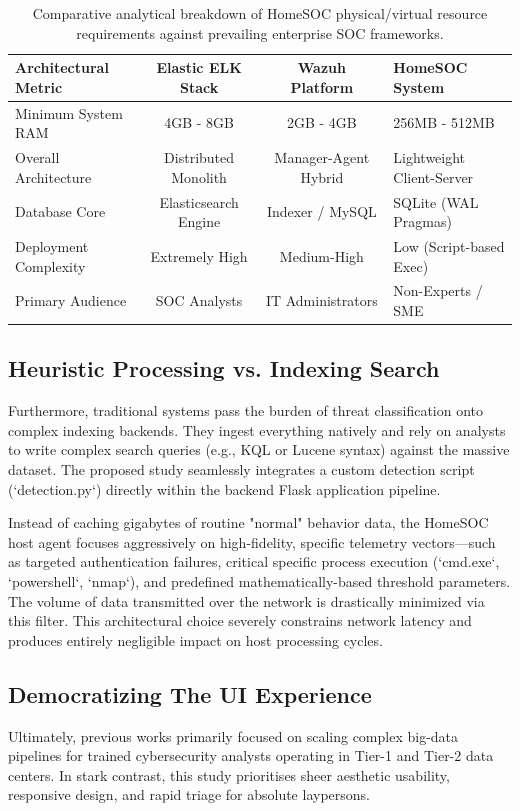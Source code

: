 \begin{table}[h]
\centering
\small
\begin{tabularx}{\textwidth}{|X|c|c|X|}
\hline
\textbf{Architectural Metric} & \textbf{Elastic ELK Stack} & \textbf{Wazuh Platform} & \textbf{HomeSOC System} \\ \hline
Minimum System RAM & 4GB - 8GB & 2GB - 4GB & 256MB - 512MB \\ \hline
Overall Architecture & Distributed Monolith & Manager-Agent Hybrid & Lightweight Client-Server \\ \hline
Database Core & Elasticsearch Engine & Indexer / MySQL & SQLite (WAL Pragmas) \\ \hline
Deployment Complexity & Extremely High & Medium-High & Low (Script-based Exec) \\ \hline
Primary Audience & SOC Analysts & IT Administrators & Non-Experts / SME \\ \hline
\end{tabularx}
\caption{Comparative analytical breakdown of HomeSOC physical/virtual resource requirements against prevailing enterprise SOC frameworks.}
\end{table}

\subsection{Heuristic Processing vs. Indexing Search}
Furthermore, traditional systems pass the burden of threat classification onto complex indexing backends. They ingest everything natively and rely on analysts to write complex search queries (e.g., KQL or Lucene syntax) against the massive dataset. The proposed study seamlessly integrates a custom detection script (`detection.py`) directly within the backend Flask application pipeline. 

Instead of caching gigabytes of routine "normal" behavior data, the HomeSOC host agent focuses aggressively on high-fidelity, specific telemetry vectors—such as targeted authentication failures, critical specific process execution (`cmd.exe`, `powershell`, `nmap`), and predefined mathematically-based threshold parameters. The volume of data transmitted over the network is drastically minimized via this filter. This architectural choice severely constrains network latency and produces entirely negligible impact on host processing cycles. 

\subsection{Democratizing The UI Experience}
Ultimately, previous works primarily focused on scaling complex big-data pipelines for trained cybersecurity analysts operating in Tier-1 and Tier-2 data centers. In stark contrast, this study prioritises sheer aesthetic usability, responsive design, and rapid triage for absolute laypersons. 

